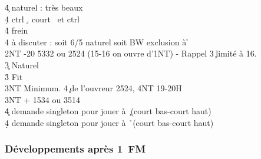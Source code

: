 \documentclass[a4paper]{article}
\begin{document}
\begin{bidtable}
4\c \> naturel : très beaux \c \\
4\d \> ctrl \d , court \s\ et ctrl \c \\
4\h \> frein\\
4\s \> à discuter : soit 6/5 naturel soit BW exclusion à \h \-\\
2NT -20 5332 ou 2524 (15-16 on ouvre d'1NT) - Rappel 3\c\ limité à 16.\+\\
3\c \> Naturel\\
3\h \> Fit \h \\
3NT \> Minimum. 4\c\ de l'ouvreur 2524, 4NT 19-20H\-\\
3NT + 1534 ou 3514\+\\
4\c \> demande singleton pour jouer à \c\ (court bas-court haut)\\
4\d \> demande singleton pour jouer à \h\ (court bas-court haut)\-\-
\end{bidtable}

\subsubsection{Développements après 1\pdfc\ FM}
\end{document}
